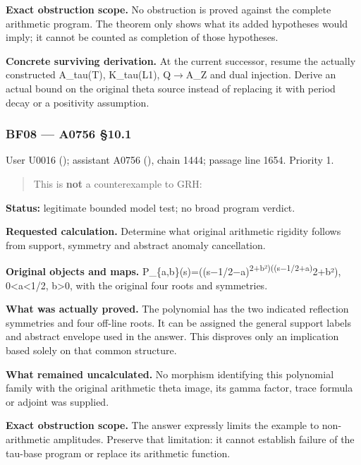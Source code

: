 \textbf{Exact obstruction scope.} No obstruction is proved against the
complete arithmetic program. The theorem only shows what its added
hypotheses would imply; it cannot be counted as completion of those
hypotheses.

\textbf{Concrete surviving derivation.} At the current successor, resume
the actually constructed A\_tau(T), K\_tau(L1),
Q\allowbreak{}\ensuremath{→}\allowbreak{}A\_Z and dual injection. Derive
an actual bound on the original theta source instead of replacing it
with period decay or a positivity assumption.

\subsubsection{BF08 --- A0756 §10.1}\label{TranscriptLedgerStage:bf08-a0756-10.1}

User U0016 (\protect{});
assistant A0756 (\protect{}),
chain 1444; passage line 1654. Priority 1.

\begin{quote}
This is \textbf{not} a counterexample to GRH:
\end{quote}

\textbf{Status:} legitimate bounded model test; no broad program
verdict.

\textbf{Requested calculation.} Determine what original arithmetic
rigidity follows from support, symmetry and abstract anomaly
cancellation.

\textbf{Original objects and maps.}
P\_\{a,b\}(s)=((s\allowbreak{}\ensuremath{−}\allowbreak{}1/2\allowbreak{}\ensuremath{−}\allowbreak{}a)\textsuperscript{2+b²)((s\allowbreak{}\ensuremath{−}\allowbreak{}1/2+a)}2+b²),
0\textless a\textless1/2, b\textgreater0, with the original four roots
and symmetries.

\textbf{What was actually proved.} The polynomial has the two indicated
reflection symmetries and four off-line roots. It can be assigned the
general support labels and abstract envelope used in the answer. This
disproves only an implication based solely on that common structure.

\textbf{What remained uncalculated.} No morphism identifying this
polynomial family with the original arithmetic theta image, its gamma
factor, trace formula or adjoint was supplied.

\textbf{Exact obstruction scope.} The answer expressly limits the
example to non-arithmetic amplitudes. Preserve that limitation: it
cannot establish failure of the tau-base program or replace its
arithmetic function.

